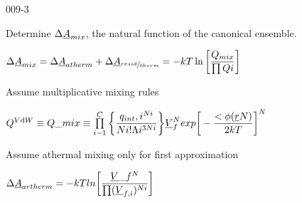 \begin{mitframe}{009-3}

        
\begin{listone}
        
    \item Determine $\iipf\uline{\helmholtz}_{\mixfunc}$, the natural function of the canonical ensemble.
    
    \begin{listtwo}
    
    	\item $\iipf\uline{\helmholtz}_{\mixfunc}=\iipf\uline{\helmholtz}_{atherm}+\iipf\uline{\helmholtz}_{\sfrac{resid}{therm}}=-\thermcond\Temp\ln\bigg[\dfrac{\heatflow_{\mixfunc}}{\prod\heatflow{\state}}\bigg]$     	%
    
    \end{listtwo}
    
    \item Assume multiplicative mixing rules
    
    \begin{listtwo}
    	
      \item $\heatflow^{\vol\mathrm{d}\work}\equiv\heatflow\_{\mixfunc}\equiv\prod\limits_{\state-1}^{\conc}\bigg\{\dfrac{\impc,\state^{\nummoles\state}}{\nummoles\state{!}\debroglie\state^{3\nummoles\state}}\bigg\}\uline{\vol}_{\fug}^{\nummoles}exp\bigg[-\dfrac{<\eleccoeff(\uline{\pos}\nummoles)}{2\thermcond\Temp}\bigg]^{\nummoles}$
      
     


    
    \end{listtwo}
    
    \item Assume athermal mixing only for first approximation
    
    \begin{listtwo}
    	
        \item$\iipf\uline{\helmholtz}_{artherm}=-\thermcond\Temp{ln}\bigg[\dfrac{\uline{\vol}\_{\fug}^{\nummoles}}{\prod(\uline{\vol}_{\fug,\state})^{\nummoles\state}}\bigg]$
        
        \begin{listthree}
        

\end{listthree}
\end{listtwo}
\end{listone}
\end{mitframe}
